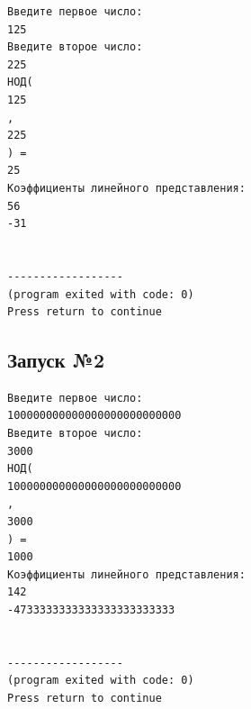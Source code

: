 \documentclass[a4paper,12pt]{article} %
\begin{document}
\begin{verbatim}
Введите первое число:
125
Введите второе число:
225
НОД(
125
,
225
) =
25
Коэффициенты линейного представления:
56
-31


------------------
(program exited with code: 0)
Press return to continue
\end{verbatim}

\subsection*{Запуск №2}
\begin{verbatim}
Введите первое число:
100000000000000000000000000
Введите второе число:
3000
НОД(
100000000000000000000000000
,
3000
) =
1000
Коэффициенты линейного представления:
142
-4733333333333333333333333


------------------
(program exited with code: 0)
Press return to continue
\end{verbatim}

\printbibliography
\end{document}
